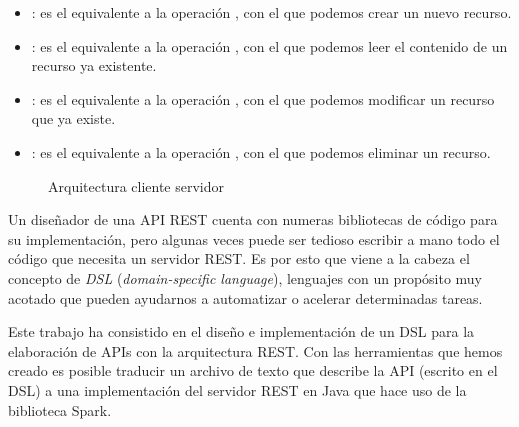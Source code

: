 \documentclass[runningheads]{llncs}
\begin{document}
\begin{itemize}
    \item \POST: es el equivalente a la operación \CREATE, con el que podemos
        crear un nuevo recurso.
    \item \GET: es el equivalente a la operación \READ, con el que podemos
        leer el contenido de un recurso ya existente.
    \item \PUT: es el equivalente a la operación \UPDATE, con el que podemos
        modificar un recurso que ya existe.
    \item \DELETE: es el equivalente a la operación \DELETE, con el que podemos
        eliminar un recurso.
\end{itemize}

\begin{figure}
\begin{center}
\end{center}
\caption{Arquitectura cliente servidor}
\label{fig:arq-cliente-serv}
\end{figure}

Un diseñador de una API REST cuenta con numeras bibliotecas de código
para su implementación, pero algunas veces puede ser tedioso escribir a
mano todo el código que necesita un servidor REST. Es por esto que viene
a la cabeza el concepto de \emph{DSL} (\emph{domain-specific language}),
lenguajes con un propósito muy acotado que pueden ayudarnos a automatizar
o acelerar determinadas tareas.

Este trabajo ha consistido en el diseño e implementación de un DSL para
la elaboración de APIs con la arquitectura REST. Con las herramientas
que hemos creado es posible traducir un archivo de texto que describe
la API (escrito en el DSL) a una implementación del servidor REST en
Java que hace uso de la biblioteca Spark.
\end{document}

